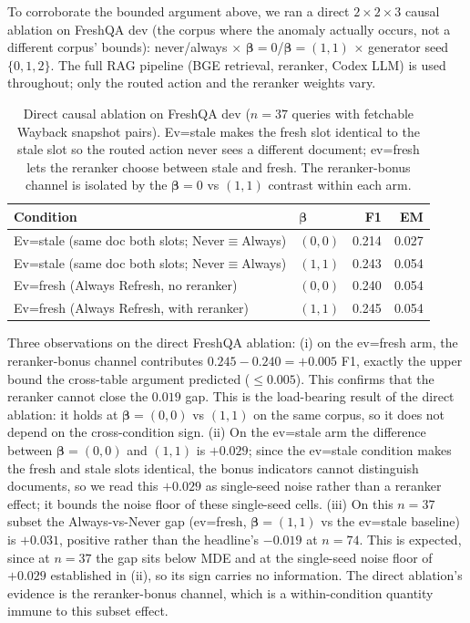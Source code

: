 \documentclass[pdflatex,sn-basic]{sn-jnl}
\begin{document}
To corroborate the bounded argument above, we ran a direct $2 \times 2 \times 3$ causal ablation on FreshQA dev (the corpus where the anomaly actually occurs, not a different corpus' bounds): never/always $\times$ $\boldsymbol{\beta}{=}0$/$\boldsymbol{\beta}{=}(1,1)$ $\times$ generator seed $\{0,1,2\}$. The full RAG pipeline (BGE retrieval, reranker, Codex LLM) is used throughout; only the routed action and the reranker weights vary.

\begin{table}[htbp]
\caption{Direct causal ablation on FreshQA dev ($n{=}37$ queries with fetchable Wayback snapshot pairs). Ev=stale makes the fresh slot identical to the stale slot so the routed action never sees a different document; ev=fresh lets the reranker choose between stale and fresh. The reranker-bonus channel is isolated by the $\boldsymbol{\beta}{=}0$ vs $(1,1)$ contrast within each arm.}
\label{tab:freshqa-decomp-direct}
\centering
\begin{tabular}{llrr}
\toprule
Condition & $\boldsymbol{\beta}$ & F1 & EM \\
\midrule
Ev=stale (same doc both slots; Never$\equiv$Always) & $(0,0)$  & 0.214 & 0.027 \\
Ev=stale (same doc both slots; Never$\equiv$Always) & $(1,1)$ & 0.243 & 0.054 \\
\midrule
Ev=fresh (Always Refresh, no reranker) & $(0,0)$  & 0.240 & 0.054 \\
Ev=fresh (Always Refresh, with reranker) & $(1,1)$ & 0.245 & 0.054 \\
\bottomrule
\end{tabular}
\end{table}

Three observations on the direct FreshQA ablation: (i) on the ev=fresh arm, the reranker-bonus channel contributes $0.245 - 0.240 = +0.005$ F1, exactly the upper bound the cross-table argument predicted ($\le 0.005$). This confirms that the reranker cannot close the $0.019$ gap. This is the load-bearing result of the direct ablation: it holds at $\boldsymbol{\beta}{=}(0,0)$ vs $(1,1)$ on the same corpus, so it does not depend on the cross-condition sign. (ii) On the ev=stale arm the difference between $\boldsymbol{\beta}{=}(0,0)$ and $(1,1)$ is $+0.029$; since the ev=stale condition makes the fresh and stale slots identical, the bonus indicators cannot distinguish documents, so we read this $+0.029$ as single-seed noise rather than a reranker effect; it bounds the noise floor of these single-seed cells. (iii) On this $n{=}37$ subset the Always-vs-Never gap (ev=fresh, $\boldsymbol{\beta}{=}(1,1)$ vs the ev=stale baseline) is $+0.031$, positive rather than the headline's $-0.019$ at $n{=}74$. This is expected, since at $n{=}37$ the gap sits below MDE and at the single-seed noise floor of $+0.029$ established in (ii), so its sign carries no information. The direct ablation's evidence is the reranker-bonus channel, which is a within-condition quantity immune to this subset effect.
\end{document}
